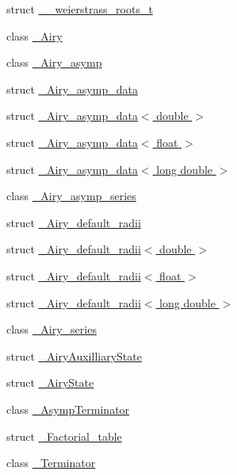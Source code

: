 \begin{DoxyCompactItemize}
\item 
struct \hyperlink{structstd_1_1____detail_1_1____weierstrass__roots__t}{\+\_\+\+\_\+weierstrass\+\_\+roots\+\_\+t}
\item 
class \hyperlink{classstd_1_1____detail_1_1__Airy}{\+\_\+\+Airy}
\item 
class \hyperlink{classstd_1_1____detail_1_1__Airy__asymp}{\+\_\+\+Airy\+\_\+asymp}
\item 
struct \hyperlink{structstd_1_1____detail_1_1__Airy__asymp__data}{\+\_\+\+Airy\+\_\+asymp\+\_\+data}
\item 
struct \hyperlink{structstd_1_1____detail_1_1__Airy__asymp__data_3_01double_01_4}{\+\_\+\+Airy\+\_\+asymp\+\_\+data$<$ double $>$}
\item 
struct \hyperlink{structstd_1_1____detail_1_1__Airy__asymp__data_3_01float_01_4}{\+\_\+\+Airy\+\_\+asymp\+\_\+data$<$ float $>$}
\item 
struct \hyperlink{structstd_1_1____detail_1_1__Airy__asymp__data_3_01long_01double_01_4}{\+\_\+\+Airy\+\_\+asymp\+\_\+data$<$ long double $>$}
\item 
class \hyperlink{classstd_1_1____detail_1_1__Airy__asymp__series}{\+\_\+\+Airy\+\_\+asymp\+\_\+series}
\item 
struct \hyperlink{structstd_1_1____detail_1_1__Airy__default__radii}{\+\_\+\+Airy\+\_\+default\+\_\+radii}
\item 
struct \hyperlink{structstd_1_1____detail_1_1__Airy__default__radii_3_01double_01_4}{\+\_\+\+Airy\+\_\+default\+\_\+radii$<$ double $>$}
\item 
struct \hyperlink{structstd_1_1____detail_1_1__Airy__default__radii_3_01float_01_4}{\+\_\+\+Airy\+\_\+default\+\_\+radii$<$ float $>$}
\item 
struct \hyperlink{structstd_1_1____detail_1_1__Airy__default__radii_3_01long_01double_01_4}{\+\_\+\+Airy\+\_\+default\+\_\+radii$<$ long double $>$}
\item 
class \hyperlink{classstd_1_1____detail_1_1__Airy__series}{\+\_\+\+Airy\+\_\+series}
\item 
struct \hyperlink{structstd_1_1____detail_1_1__AiryAuxilliaryState}{\+\_\+\+Airy\+Auxilliary\+State}
\item 
struct \hyperlink{structstd_1_1____detail_1_1__AiryState}{\+\_\+\+Airy\+State}
\item 
class \hyperlink{classstd_1_1____detail_1_1__AsympTerminator}{\+\_\+\+Asymp\+Terminator}
\item 
struct \hyperlink{structstd_1_1____detail_1_1__Factorial__table}{\+\_\+\+Factorial\+\_\+table}
\item 
class \hyperlink{classstd_1_1____detail_1_1__Terminator}{\+\_\+\+Terminator}
\end{DoxyCompactItemize}
